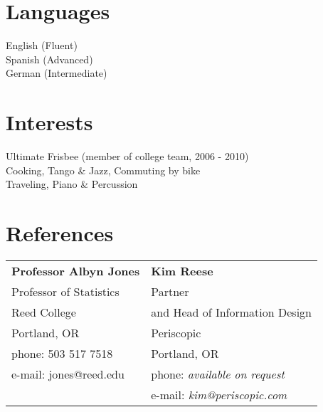 \documentclass[margin,line]{resume}
\begin{document}
\begin{resume}
    \section{\mysidestyle Languages}
English (Fluent) \\
Spanish (Advanced)\\
German (Intermediate)   %

\newpage
    \section{\mysidestyle Interests} 

Ultimate Frisbee (member of college team, 2006 - 2010) \\
Cooking, Tango \& Jazz, Commuting by bike \\
Traveling, Piano \& Percussion \\







\section{\mysidestyle References} 

\begin{tabular}{@{}p{6cm}p{6cm}}
\textbf{Professor Albyn Jones}       &  \textbf{Kim Reese}                   \\
Professor of Statistics                              &  Partner                        \\
Reed College                     &  and Head of Information Design                  \\
Portland, OR           & Periscopic        \\
phone: 503 517 7518    &  Portland, OR    \\
e-mail: jones@reed.edu   &  phone: \textsl{available on request}     \\
 & e-mail:\textsl{ kim@periscopic.com  }
\end{tabular}


\end{resume}
\end{document}
